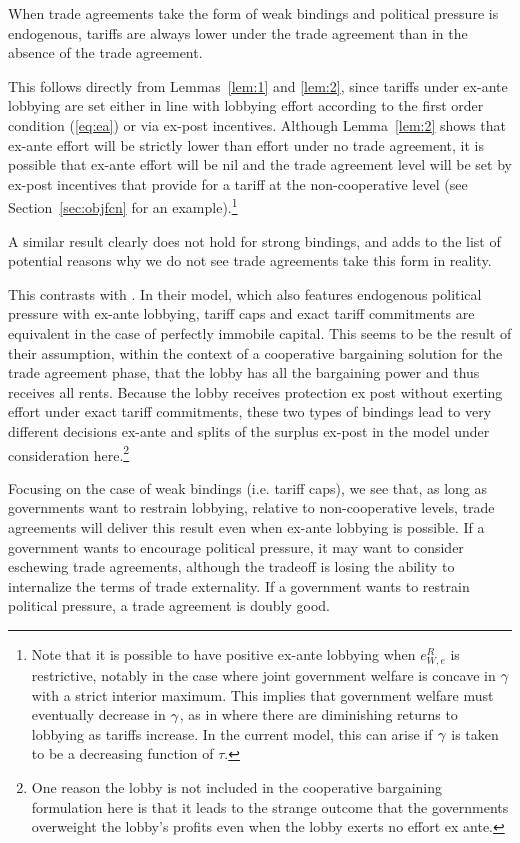 \begin{result}
	When trade agreements take the form of weak bindings and political pressure is endogenous, tariffs are always lower under the trade agreement than in the absence of the trade agreement. 
\end{result}

This follows directly from Lemmas~\ref{lem:1} and \ref{lem:2}, since tariffs under ex-ante lobbying are set either in line with lobbying effort according to the first order condition (\ref{eq:ea}) or via ex-post incentives. Although Lemma~\ref{lem:2} shows that ex-ante effort will be strictly lower than effort under no trade agreement, it is possible that ex-ante effort will be nil and the trade agreement level will be set by ex-post incentives that provide for a tariff at the non-cooperative level (see Section~\ref{sec:objfcn} for an example).\footnote{Note that it is possible to have positive ex-ante lobbying when $e^R_{W,e}$ is restrictive, notably in the case where joint government welfare is concave in $\gamma$ with a strict interior maximum. This implies that government welfare must eventually decrease in $\gamma$, as in \Textcite{ethier2012} where there are diminishing returns to lobbying as tariffs increase. In the current model, this can arise if $\gamma$ is taken to be a decreasing function of $\tau$.}


A similar result clearly does not hold for strong bindings, and adds to the list of potential reasons why we do not see trade agreements take this form in reality.

This contrasts with \Textcite{mrc2007}. In their model, which also features endogenous political pressure with ex-ante lobbying, tariff caps and exact tariff commitments are equivalent in the case of perfectly immobile capital. This seems to be the result of their assumption, within the context of a cooperative bargaining solution for the trade agreement phase, that the lobby has all the bargaining power and thus receives all rents. Because the lobby receives protection ex post without exerting effort under exact tariff commitments, these two types of bindings lead to very different decisions ex-ante and splits of the surplus ex-post in the model under consideration here.\footnote{One reason the lobby is not included in the cooperative bargaining formulation here is that it leads to the strange outcome that the governments overweight the lobby's profits even when the lobby exerts no effort ex ante.}

Focusing on the case of weak bindings (i.e. tariff caps), we see that, as long as governments want to restrain lobbying, relative to non-cooperative levels, trade agreements will deliver this result even when ex-ante lobbying is possible. If a government wants to encourage political pressure, it may want to consider eschewing trade agreements, although the tradeoff is losing the ability to internalize the terms of trade externality. If a government wants to restrain political pressure, a trade agreement is doubly good.

